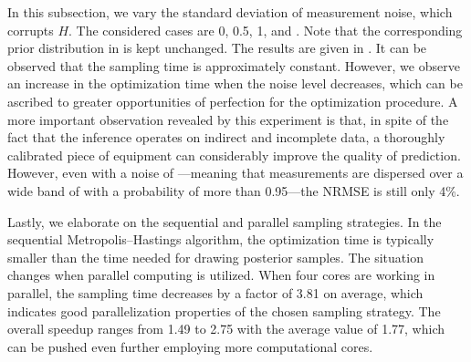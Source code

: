 
In this subsection, we vary the standard deviation of measurement noise, which
corrupts $H$. The considered cases are 0, 0.5, 1, and 
\cite{mesa-martinez2007}. Note that the corresponding prior distribution in
 is kept unchanged. The results are given in
. It can be observed that the sampling time is
approximately constant. However, we observe an increase in the optimization time
when the noise level decreases, which can be ascribed to greater opportunities
of perfection for the optimization procedure. A more important observation
revealed by this experiment is that, in spite of the fact that the inference
operates on indirect and incomplete data, a thoroughly calibrated piece of
equipment can considerably improve the quality of prediction. However, even with
a noise of ---meaning that measurements are dispersed over a wide
band of  with a probability of more than 0.95---the \ac{NRMSE} is
still only 4\%.


Lastly, we elaborate on the sequential and parallel sampling strategies. In the
sequential Metropolis--Hastings algorithm, the optimization time is typically
smaller than the time needed for drawing posterior samples. The situation
changes when parallel computing is utilized. When four cores are working in
parallel, the sampling time decreases by a factor of 3.81 on average, which
indicates good parallelization properties of the chosen sampling strategy. The
overall speedup ranges from 1.49 to 2.75 with the average value of 1.77, which
can be pushed even further employing more computational cores.

